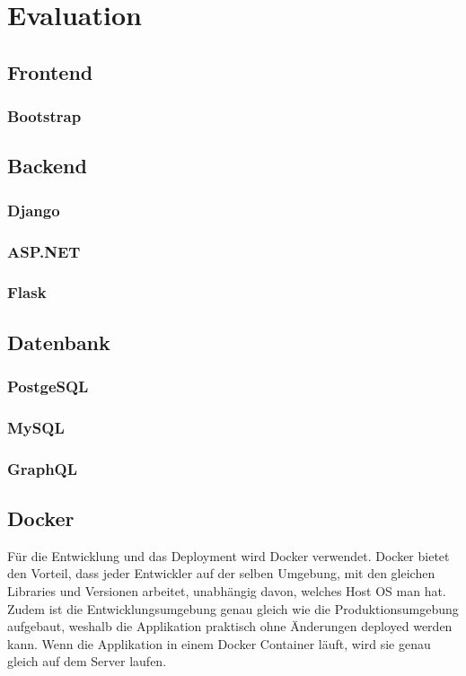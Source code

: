 \section{Evaluation}
\subsection{Frontend}
\subsubsection{Bootstrap}


\subsection{Backend}
\subsubsection{Django}
\subsubsection{ASP.NET}
\subsubsection{Flask}


\subsection{Datenbank}
\subsubsection{PostgeSQL}
\subsubsection{MySQL}
\subsubsection{GraphQL}

\subsection{Docker}
Für die Entwicklung und das Deployment wird Docker verwendet. Docker bietet den Vorteil, dass jeder Entwickler auf der selben Umgebung, mit den gleichen Libraries und Versionen arbeitet, unabhängig davon, welches Host OS man hat. Zudem ist die Entwicklungsumgebung genau gleich wie die Produktionsumgebung aufgebaut, weshalb die Applikation praktisch ohne Änderungen deployed werden kann. Wenn die Applikation in einem Docker Container läuft, wird sie genau gleich auf dem Server laufen.

